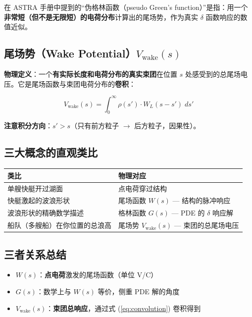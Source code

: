 \documentclass[a4paper,11pt]{article}
\begin{document}
在 ASTRA 手册中提到的``伪格林函数（pseudo Green's function）''是指：用一个\textbf{非常短（但不是无限短）的电荷分布}计算出的尾场势，作为真实 $\delta$ 函数响应的数值近似。

\subsection{尾场势（Wake Potential）$V_{\text{wake}}(s)$}

\textbf{物理定义}：一个\textbf{有实际长度和电荷分布的真实束团}在位置 $s$ 处感受到的总尾场电压。它是尾场函数与束团电荷分布的\textbf{卷积}：

\begin{equation}
  V_{\text{wake}}(s) = \int_{0}^{\infty} \rho(s') \cdot W_L(s - s') \; ds'
  \label{eq:convolution}
\end{equation}

\textbf{注意积分方向}：$s' > s$（只有前方粒子 $\to$ 后方粒子，因果性）。

\subsection{三大概念的直观类比}

\begin{center}
\begin{tabular}{p{4cm} p{8cm}}
\toprule
\textbf{类比} & \textbf{物理对应} \\
\midrule
单艘快艇开过湖面 & 点电荷穿过结构 \\
快艇激起的波浪形状 & 尾场函数 $W(s)$ — 结构的脉冲响应 \\
波浪形状的精确数学描述 & 格林函数 $G(s)$ — PDE 的 $\delta$ 响应解 \\
船队（多艘船）在你位置的总浪高 & 尾场势 $V_{\text{wake}}(s)$ — 束团的总尾场电压 \\
\bottomrule
\end{tabular}
\end{center}

\subsection{三者关系总结}

\begin{tcolorbox}[title=关键区别]
  \begin{itemize}
    \item $W(s)$：\textbf{点电荷}激发的尾场函数（单位 V/C）
    \item $G(s)$：数学上与 $W(s)$ 等价，侧重 PDE 解的角度
    \item $V_{\text{wake}}(s)$：\textbf{束团总响应}，通过式 (\ref{eq:convolution}) 卷积得到
  \end{itemize}
\end{tcolorbox}
\end{document}
